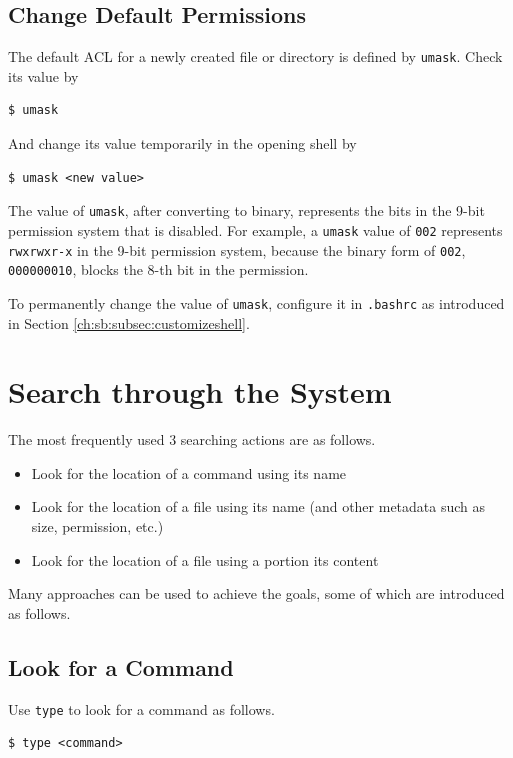 \subsection{Change Default Permissions}

The default ACL for a newly created file or directory is defined by \verb|umask|. Check its value by
\begin{lstlisting}
$ umask
\end{lstlisting}
And change its value temporarily in the opening shell by
\begin{lstlisting}
$ umask <new value>
\end{lstlisting}

The value of \verb|umask|, after converting to binary, represents the bits in the 9-bit permission system that is disabled. For example, a \verb|umask| value of \verb|002| represents \verb|rwxrwxr-x| in the 9-bit permission system, because the binary form of \verb|002|, \verb|000000010|, blocks the $8$-th bit in the permission.

To permanently change the value of \verb|umask|, configure it in \verb|.bashrc| as introduced in Section \ref{ch:sb:subsec:customizeshell}.

\section{Search through the System}

The most frequently used 3 searching actions are as follows.
\begin{itemize}
  \item Look for the location of a command using its name
  \item Look for the location of a file using its name (and other metadata such as size, permission, etc.)
  \item Look for the location of a file using a portion its content
\end{itemize}

Many approaches can be used to achieve the goals, some of which are introduced as follows.

\subsection{Look for a Command}

Use \verb|type| to look for a command as follows.
\begin{lstlisting}
$ type <command>
\end{lstlisting}

